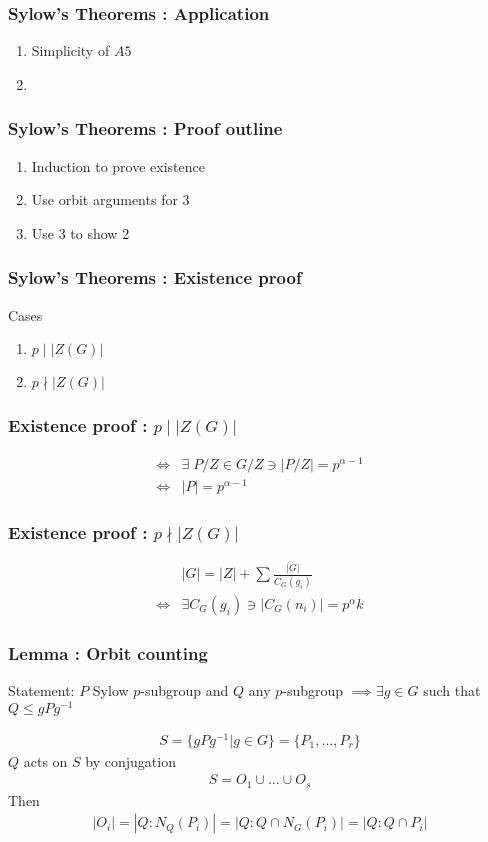 \documentclass{beamer}
\begin{document}
\begin{frame}
    \frametitle{Sylow's Theorems : Application}
    \begin{enumerate}
        \item Simplicity of $A5$
        \item 
    \end{enumerate}
\end{frame}

\begin{frame}
    \frametitle{Sylow's Theorems : Proof outline}
    \begin{enumerate}
        \item Induction to prove existence
        \item Use orbit arguments for 3
        \item Use 3 to show 2
    \end{enumerate}
\end{frame}

\begin{frame}
    \frametitle{Sylow's Theorems : Existence proof}
    Cases
    \begin{enumerate}
        \item $p\mid |Z(G)|$
        \item $p\nmid |Z(G)|$
    \end{enumerate}
\end{frame}

\begin{frame}
    \frametitle{Existence proof : $p\mid |Z(G)|$}
    \begin{align*}
        \iff&\exists\; P/Z\in G/Z\ni |P/Z| = p^{\alpha - 1}\\
        \iff& |P| = p^{\alpha - 1}
    \end{align*}
\end{frame}

\begin{frame}
    \frametitle{Existence proof : $p\nmid |Z(G)|$}
    \begin{align*}
        &|G| = |Z| + \sum\frac{|G|}{C_G(g_i)}\\
        \iff&\exists C_G(g_i)\ni |C_G(n_i)| = p^\alpha k
    \end{align*}
\end{frame}

\begin{frame}
    \frametitle{Lemma : Orbit counting}
    Statement: $P$ Sylow $p$-subgroup and $Q$ any $p$-subgroup $\implies\exists
    g\in G$ such that $Q\leq gPg^{-1}$

    \begin{gather*}
        S = \{gPg^{-1} | g\in G\} = \{P_1,\dots,P_r\}
    \end{gather*}
    $Q$ acts on $S$ by conjugation
    \begin{gather*}
        S = O_1\cup\dots\cup O_s
    \end{gather*}
    Then
    \begin{gather*}
        |O_i| = |Q:N_Q(P_i)| = |Q:Q\cap N_G(P_i)| = |Q:Q\cap P_i|
    \end{gather*}
\end{frame}
\end{document}
